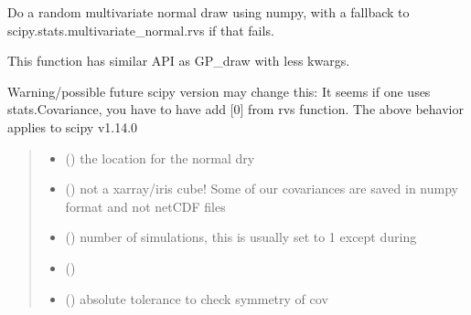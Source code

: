 \documentclass[letterpaper,10pt,english]{sphinxmanual}
\begin{document}
\begin{fulllineitems}
\label{\detokenize{kriging:glomar_gridding.stochastic.draw_from_cov}}
\pysigstartsignatures
\pysiglinewithargsret
{}
{\sphinxparamcomma {}\sphinxparamcomma {}\sphinxparamcomma {}\sphinxparamcomma {}\sphinxparamcomma {}}
{}
\pysigstopsignatures
\sphinxAtStartPar
Do a random multivariate normal draw using numpy, with a fallback to
scipy.stats.multivariate\_normal.rvs if that fails.

\sphinxAtStartPar
This function has similar API as GP\_draw with less kwargs.

\sphinxAtStartPar
Warning/possible future scipy version may change this:
It seems if one uses stats.Covariance, you have to have add {[}0{]} from rvs
function. The above behavior applies to scipy v1.14.0
\begin{quote}\begin{description}
\begin{itemize}
\item {}
\sphinxAtStartPar
{} () \textendash{} the location for the normal dry

\item {}
\sphinxAtStartPar
{} () \textendash{} not a xarray/iris cube! Some of our covariances are saved in numpy
format and not netCDF files

\item {}
\sphinxAtStartPar
{} () \textendash{} number of simulations, this is usually set to 1 except during

\item {}
\sphinxAtStartPar
{} ()

\item {}
\sphinxAtStartPar
{} () \textendash{} absolute tolerance to check symmetry of cov


\end{itemize}
\end{description}
\end{quote}
\end{fulllineitems}
\end{document}
